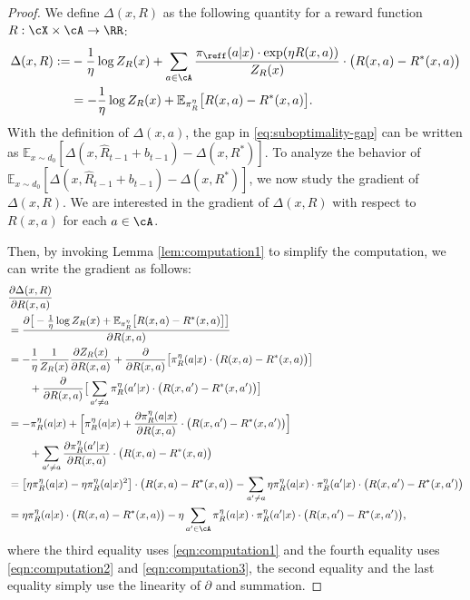 \documentclass[11pt]{article}
\newcommand{\rE}{\mathbb E}
\newcommand{\E}{\mathbb E}
\begin{document}
\begin{proof}
We define $\Delta(x,R)$ as the following quantity for a reward function $R: \cX \times \cA \to \RR$: \begin{equation}
\begin{aligned}
    \Delta(x,R) :=& -\frac{1}{\eta} \log Z_R(x) + \sum_{a \in \cA}  \frac{ \pi_{\reff}(a|x) \cdot \exp(\eta R(x, a))}{Z_R(x)}\cdot \bigl(R(x, a) - R^*(x, a)\bigr)\\
    &= - \frac{1}{\eta} \log Z_R(x) + \E_{\pi_R^\eta} \big[R(x,a) - R^*(x,a)\big].
    \label{eq:delta-R}
\end{aligned}  
    \end{equation} 
With the definition of $\Delta(x,a)$, the gap in \eqref{eq:suboptimality-gap} can be written as $\rE_{x \sim d_0}[\Delta(x, \hat R_{t - 1} + b_{t - 1}) - \Delta(x, R^*)]$. To analyze the behavior of $\rE_{x \sim d_0}[\Delta(x, \hat R_{t - 1} + b_{t - 1}) - \Delta(x, R^*)]$, we now study the gradient of $\Delta(x,R)$. We are interested in the gradient of $\Delta(x,R)$ with respect to $R(x,a)$ for each $a\in\cA$.

Then, by invoking Lemma \ref{lem:computation1} to simplify the computation, we can write the gradient as follows:
\begin{align*}
        &\frac{\partial\Delta(x,R)}{\partial R(x,a)} \\&= \frac{\partial\big[- \frac{1}{\eta} \log Z_R(x) + \E_{\pi_R^\eta} \big[R(x,a) - R^*(x,a)\big]\big]}{\partial R(x,a)}\\
        &= - \frac{1}{\eta} \frac{1}{Z_R(x)} \frac{\partial Z_R(x)}{\partial R(x,a)} + \frac{\partial}{\partial R(x,a)}\big[ \pi_R^\eta(a|x) \cdot  \big(R(x,a) - R^*(x,a)\big)\big] \\
        &\qquad +  \frac{\partial}{\partial R(x,a)}\big[\sum_{a' \neq a} \pi_R^\eta(a'|x) \cdot  \big(R(x,a') - R^*(x,a')\big)\big] \\
        &= - \pi_R^\eta(a|x) + \Big[ \pi_R^\eta(a|x) + \frac{\partial \pi^\eta_R(a|x)}{\partial R(x,a)} \cdot \big(R(x,a') - R^*(x,a')\big)  \Big]\\
        &\qquad + \sum_{a' \neq a} \frac{\partial \pi^\eta_R(a'|x)}{\partial R(x,a)} \cdot \big(R(x,a) - R^*(x,a)\big)\\
        &= \big[\eta \pi_R^\eta(a|x) - \eta \pi_R^\eta(a|x)^2\big] \cdot \big(R(x,a) - R^*(x,a)\big) - \sum_{a' \neq a}\eta \pi_R^\eta(a|x) \cdot \pi_R^\eta(a'|x) \cdot \big(R(x,a') - R^*(x,a')\big) \\
        &= \eta \pi_R^\eta(a|x) \cdot \big(R(x,a) - R^*(x,a)\big)  - \eta \sum_{a' \in \cA} \pi_R^\eta(a|x) \cdot \pi_R^\eta(a'|x) \cdot \big(R(x,a') - R^*(x,a')\big), 
\end{align*}
where the third equality uses \eqref{eqn:computation1} and the fourth equality uses \eqref{eqn:computation2} and \eqref{eqn:computation3}, the second equality and the last equality simply use the linearity of $\partial$ and summation. 


\end{proof}
\end{document}
